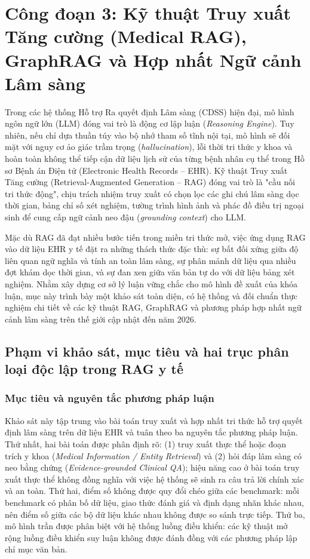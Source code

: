 \section{Công đoạn 3: Kỹ thuật Truy xuất Tăng cường (Medical RAG), GraphRAG và Hợp nhất Ngữ cảnh Lâm sàng}
\label{sec:chap2_medical_rag}

Trong các hệ thống Hỗ trợ Ra quyết định Lâm sàng (CDSS) hiện đại, mô hình ngôn ngữ lớn (LLM) đóng vai trò là động cơ lập luận (\emph{Reasoning Engine}). Tuy nhiên, nếu chỉ dựa thuần túy vào bộ nhớ tham số tĩnh nội tại, mô hình sẽ đối mặt với nguy cơ ảo giác trầm trọng (\emph{hallucination}), lỗi thời tri thức y khoa và hoàn toàn không thể tiếp cận dữ liệu lịch sử của từng bệnh nhân cụ thể trong Hồ sơ Bệnh án Điện tử (Electronic Health Records -- EHR). Kỹ thuật Truy xuất Tăng cường (Retrieval-Augmented Generation -- RAG) đóng vai trò là "cầu nối tri thức động", chịu trách nhiệm truy xuất có chọn lọc các ghi chú lâm sàng dọc thời gian, bảng chỉ số xét nghiệm, tường trình hình ảnh và phác đồ điều trị ngoại sinh để cung cấp ngữ cảnh neo đậu (\emph{grounding context}) cho LLM.

Mặc dù RAG đã đạt nhiều bước tiến trong miền tri thức mở, việc ứng dụng RAG vào dữ liệu EHR y tế đặt ra những thách thức đặc thù: sự bất đối xứng giữa độ liên quan ngữ nghĩa và tính an toàn lâm sàng, sự phân mảnh dữ liệu qua nhiều đợt khám dọc thời gian, và sự đan xen giữa văn bản tự do với dữ liệu bảng xét nghiệm. Nhằm xây dựng cơ sở lý luận vững chắc cho mô hình đề xuất của khóa luận, mục này trình bày một khảo sát toàn diện, có hệ thống và đối chuẩn thực nghiệm chi tiết về các kỹ thuật RAG, GraphRAG và phương pháp hợp nhất ngữ cảnh lâm sàng trên thế giới cập nhật đến năm 2026.

\subsection{Phạm vi khảo sát, mục tiêu và hai trục phân loại độc lập trong RAG y tế}

\subsubsection{Mục tiêu và nguyên tắc phương pháp luận}
Khảo sát này tập trung vào bài toán truy xuất và hợp nhất tri thức hỗ trợ quyết định lâm sàng trên dữ liệu EHR và tuân theo ba nguyên tắc phương pháp luận. Thứ nhất, hai bài toán được phân định rõ: (1) truy xuất thực thể hoặc đoạn trích y khoa (\emph{Medical Information / Entity Retrieval}) và (2) hỏi đáp lâm sàng có neo bằng chứng (\emph{Evidence-grounded Clinical QA}); hiệu năng cao ở bài toán truy xuất thực thể không đồng nghĩa với việc hệ thống sẽ sinh ra câu trả lời chính xác và an toàn. Thứ hai, điểm số không được quy đổi chéo giữa các benchmark: mỗi benchmark có phân bố dữ liệu, giao thức đánh giá và định dạng nhãn khác nhau, nên điểm số giữa các bộ dữ liệu khác nhau không được so sánh trực tiếp. Thứ ba, mô hình trần được phân biệt với hệ thống luồng điều khiển: các kỹ thuật mở rộng luồng điều khiển suy luận không được đánh đồng với các phương pháp lập chỉ mục văn bản.

